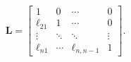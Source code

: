 \[\mathbf{L}=\begin{bmatrix}1&0&\cdots&0\\
\ell_{21}&1&\cdots&0\\
\vdots&\ddots&\ddots&\vdots\\
\ell_{n1}&\cdots&\ell_{n,n-1}&1\end{bmatrix}.\]